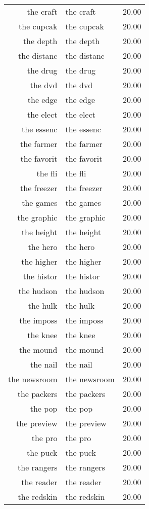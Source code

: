 \begin{table}[ht]
\begin{tabular}{rlr}
  the craft & the craft & 20.00 \\ 
  the cupcak & the cupcak & 20.00 \\ 
  the depth & the depth & 20.00 \\ 
  the distanc & the distanc & 20.00 \\ 
  the drug & the drug & 20.00 \\ 
  the dvd & the dvd & 20.00 \\ 
  the edge & the edge & 20.00 \\ 
  the elect & the elect & 20.00 \\ 
  the essenc & the essenc & 20.00 \\ 
  the farmer & the farmer & 20.00 \\ 
  the favorit & the favorit & 20.00 \\ 
  the fli & the fli & 20.00 \\ 
  the freezer & the freezer & 20.00 \\ 
  the games & the games & 20.00 \\ 
  the graphic & the graphic & 20.00 \\ 
  the height & the height & 20.00 \\ 
  the hero & the hero & 20.00 \\ 
  the higher & the higher & 20.00 \\ 
  the histor & the histor & 20.00 \\ 
  the hudson & the hudson & 20.00 \\ 
  the hulk & the hulk & 20.00 \\ 
  the imposs & the imposs & 20.00 \\ 
  the knee & the knee & 20.00 \\ 
  the mound & the mound & 20.00 \\ 
  the nail & the nail & 20.00 \\ 
  the newsroom & the newsroom & 20.00 \\ 
  the packers & the packers & 20.00 \\ 
  the pop & the pop & 20.00 \\ 
  the preview & the preview & 20.00 \\ 
  the pro & the pro & 20.00 \\ 
  the puck & the puck & 20.00 \\ 
  the rangers & the rangers & 20.00 \\ 
  the reader & the reader & 20.00 \\ 
  the redskin & the redskin & 20.00 \\ 

\end{tabular}
\end{table}
